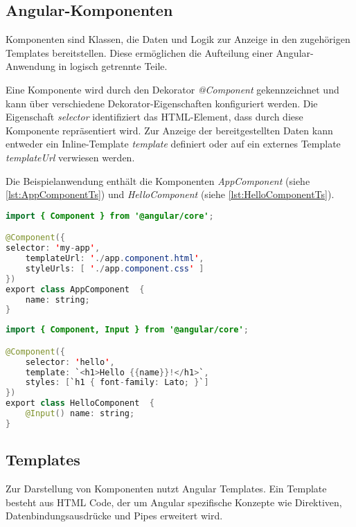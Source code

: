 \subsection{Angular-Komponenten}

Komponenten sind Klassen, die Daten und Logik zur Anzeige in den zugehörigen Templates bereitstellen. Diese ermöglichen die Aufteilung einer Angular-Anwendung in logisch getrennte Teile. \autocite[vgl.][401]{Freeman.2018} 

Eine Komponente wird durch den Dekorator \textit{@Component} gekennzeichnet und kann über verschiedene Dekorator-Eigenschaften konfiguriert werden. Die Eigenschaft \textit{selector} identifiziert das HTML-Element, dass durch diese Komponente repräsentiert wird. Zur Anzeige der bereitgestellten Daten kann entweder ein Inline-Template \textit{template} definiert oder auf ein externes Template \textit{templateUrl} verwiesen werden. \autocites[vgl.][]{Google.b}[vgl.][405]{Freeman.2018}[vgl.][47\psqq]{Steyer.2017}

Die Beispielanwendung enthält die Komponenten \textit{AppComponent} (siehe \autoref{lst:AppComponentTs}) und \textit{HelloComponent} (siehe \autoref{lst:HelloComponentTs}).

\begin{lstlisting}[caption=Die Komponente AppComponent in der Datei app.component.ts, label=lst:AppComponentTs, language=Java]
import { Component } from '@angular/core';

@Component({
selector: 'my-app',
	templateUrl: './app.component.html',
	styleUrls: [ './app.component.css' ]
})
export class AppComponent  {
	name: string;
}
\end{lstlisting}

\begin{lstlisting}[caption=Die Komponente HelloComponent in der Datei hello.component.ts, label=lst:HelloComponentTs, language=Java]
import { Component, Input } from '@angular/core';

@Component({
	selector: 'hello',
	template: `<h1>Hello {{name}}!</h1>`,
	styles: [`h1 { font-family: Lato; }`]
})
export class HelloComponent  {
	@Input() name: string;
}
\end{lstlisting}

\subsection{Templates}\label{sec:aTemp}
Zur Darstellung von Komponenten nutzt Angular Templates. Ein Template besteht aus HTML Code, der um Angular spezifische Konzepte wie Direktiven, Datenbindungsausdrücke und Pipes erweitert wird. \autocites[vgl.][]{Google.b}[vgl.][52]{Steyer.2017} 

